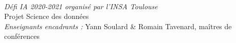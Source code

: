 			\begin{minipage}{0.4\textwidth}
            
            \hfill\\
            \hfill\\
            \hfill\\
            \hfill\\
            \hfill\\
            \hfill\\
            \hfill\\
            \hfill\\
            \hfill\\
            \hfill\\\hfill\\\hfill\\\hfill\\\hfill\\\hfill\\\hfill\\\hfill\\\hfill\\\hfill\\\hfill\\\hfill\\\hfill\\\hfill\\\hfill\\\hfill\\\hfill\\\hfill\\
            \hfill\\\hfill\\\hfill\\\hfill\\\hfill\\\hfill\\
			\begin{flushright} \large
			\emph{Défi IA 2020-2021 organisé par l'INSA Toulouse} \\
			Projet Science des données\\
			\emph{Enseignants encadrants :}
            		Yann Soulard \& Romain Tavenard, maîtres de conférences
		\end{flushright}
        
	\end{minipage}\\[2 cm]

\tableofcontents







\printendnotes



